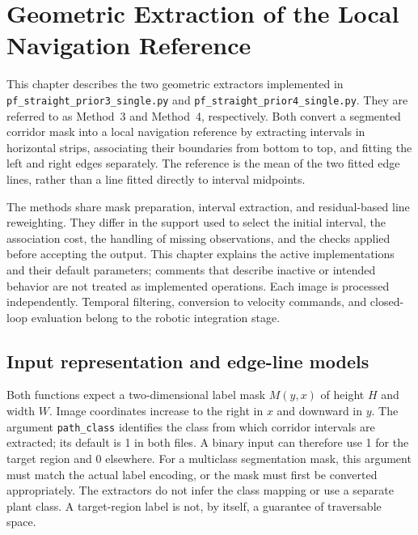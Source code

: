\chapter{Geometric Extraction of the Local Navigation Reference}
\label{cap:geometric_reference}

This chapter describes the two geometric extractors implemented in
\texttt{pf\_\allowbreak straight\_\allowbreak prior3\_\allowbreak single.py}
and
\texttt{pf\_\allowbreak straight\_\allowbreak prior4\_\allowbreak single.py}.
They are referred to as Method~3 and Method~4, respectively. Both convert
a segmented corridor mask into a local navigation reference by extracting
intervals in horizontal strips, associating their boundaries from bottom
to top, and fitting the left and right edges separately. The reference
is the mean of the two fitted edge lines, rather than a line fitted
directly to interval midpoints.

The methods share mask preparation, interval extraction, and residual-based
line reweighting. They differ in the support used to select the initial
interval, the association cost, the handling of missing observations,
and the checks applied before accepting the output. This chapter explains
the active implementations and their default parameters; comments that
describe inactive or intended behavior are not treated as implemented
operations. Each image is processed independently. Temporal filtering,
conversion to velocity commands, and closed-loop evaluation belong to
the robotic integration stage.

\section{Input representation and edge-line models}
\label{sec:c4_input}

Both functions expect a two-dimensional label mask $M(y,x)$ of height $H$
and width $W$. Image coordinates increase to the right in $x$ and downward
in $y$. The argument \texttt{path\_class} identifies the class from which
corridor intervals are extracted; its default is 1 in both files. A
binary input can therefore use 1 for the target region and 0 elsewhere.
For a multiclass segmentation mask, this argument must match the actual
label encoding, or the mask must first be converted appropriately. The
extractors do not infer the class mapping or use a separate plant class.
A target-region label is not, by itself, a guarantee of traversable space.

